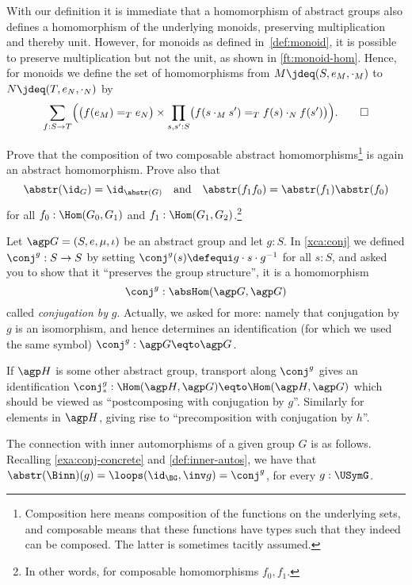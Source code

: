 \begin{remark}\label{rem:monoid-hom}
  With our definition it is immediate that a homomorphism of abstract
  groups also defines a homomorphism of the underlying monoids,
  preserving multiplication and thereby unit. However,
  for monoids as defined in~\cref{def:monoid}, it is possible to preserve
  multiplication but not the unit, as shown in \cref{ft:monoid-hom}.
  Hence, for monoids we define the set of homomorphisms
  from $M \jdeq (S,e_M,\cdot_M)$ to $N \jdeq(T,e_N,\cdot_N)$ by
  \[
    \sum_{f:S\to T}\Bigl(\bigl(f(e_M) =_T e_N\bigr)\times
    \prod_{s,s':S}\bigl(f(s\cdot_M s')=_T f(s)\cdot_N f(s')\bigr)\Bigr).%
    \qedhere
  \]
\end{remark}

\begin{xca}
Prove that the composition of two composable abstract homomorphisms\footnote{%
Composition here means composition of the functions on the underlying
sets, and composable means that these functions have types such 
that they indeed can be composed. The latter is sometimes tacitly assumed.}
is again an abstract homomorphism. Prove also that
  $$\abstr(\id_G)=\id_{\abstr(G)} \quad\text{and}\quad
  \abstr(f_1f_0)=\abstr(f_1)\abstr(f_0)$$ 
for all $f_0:\Hom(G_0,G_1)$ and $f_1:\Hom(G_1,G_2)$.\footnote{%
In other words, for composable homomorphisms $f_0,f_1$.}
\end{xca}

\begin{example}
  \label{ex:conjhom}
  Let $\agp G=(S,e,\mu,\iota)$ be an abstract group and let $g:S$. 
  In \cref{xca:conj} we defined $\conj^g:S\to S$ by setting 
  $\conj^g(s)\defequi g\cdot s\cdot g^{-1}$ for all $s:S$,
  and asked you to show that it ``preserves the group structure'',
  \ie it is a homomorphism
  \[
    \conj^g:\absHom(\agp G,\agp G)
  \]
  called \emph{conjugation by} $g$.
  Actually, we asked for more: namely that conjugation by $g$ is 
  an isomorphism, and hence determines an identification
  (for which we used the same symbol) $\conj^g:\agp G\eqto\agp G$.

  If $\agp H$ is some other abstract group, transport along $\conj^g$
  gives an identification
  $\conj^g_*:\Hom(\agp H,\agp G) \eqto \Hom(\agp H,\agp G)$
  which should be viewed as ``postcomposing with conjugation by $g$''.
  Similarly for elements in $\agp H$,
  giving rise to ``precomposition with conjugation by $h$''.
  
  The connection with inner automorphisms of a given group $G$ is
  as follows. Recalling \cref{exa:conj-concrete} and \cref{def:inner-autos},
  we have that $\abstr(\Binn)(g)=\loops(\id_{\BG},\inv g)=\conj^g$,
  for every $g:\USymG$.
\end{example}

